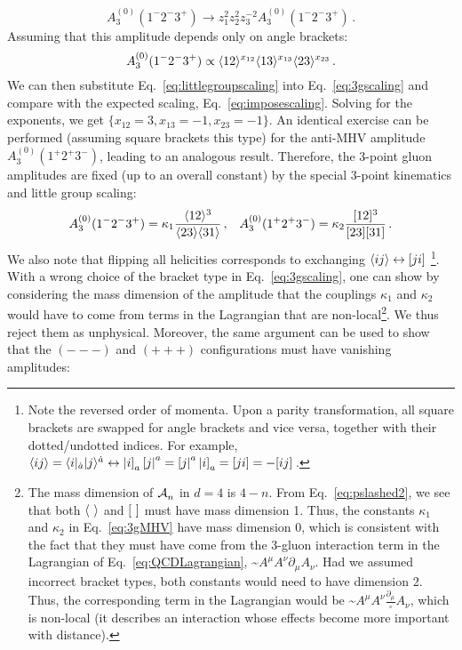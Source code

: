 \documentclass[main.tex]{subfiles}
\begin{document}
\begin{equation} \label{eq:imposescaling}
    A_3^{(0)} (1^-2^-3^+) \rightarrow z_1^2 z_2^2 z_3^{-2} A_3^{(0)}(1^-2^-3^+) \,.
\end{equation}
Assuming that this amplitude depends only on angle brackets:
\begin{equation} \label{eq:3gscaling}
    A_3^{(0)} (1^-2^-3^+) \propto \langle 12 \rangle^{x_{12}} \langle 13 \rangle^{x_{13}} \langle 23 \rangle^{x_{23}} \,.
\end{equation}
We can then substitute Eq.~\ref{eq:littlegroupscaling} into Eq.~\ref{eq:3gscaling} and compare with the expected scaling, Eq.~\ref{eq:imposescaling}. Solving for the exponents, we get $\{x_{12} = 3, x_{13} = -1, x_{23} = -1\}$. An identical exercise can be performed (assuming square brackets this type) for the anti-MHV amplitude $A_3^{(0)} (1^+2^+3^-)$, leading to an analogous result. Therefore, the 3-point gluon amplitudes are fixed (up to an overall constant) by the special 3-point kinematics and little group scaling:
\begin{align} \label{eq:3gMHV}
    A_3^{(0)} (1^-2^-3^+) = \kappa_1 \frac{\langle 12 \rangle^3}{\langle 23 \rangle\langle 31 \rangle}\,, && A_3^{(0)} (1^+2^+3^-) = \kappa_2 \frac{[ 12 ]^3}{[ 23 ][ 31 ]} \,.
\end{align}
We also note that flipping all helicities corresponds to exchanging $\langle ij \rangle \leftrightarrow [ ji ]$ \footnote{Note the reversed order of momenta. Upon a parity transformation, all square brackets are swapped for angle brackets and vice versa, together with their dotted/undotted indices. For example, $\langle ij \rangle = \langle i|_{\dot{a}} |j \rangle^{\dot{a}} \leftrightarrow \left| i \right]_a \left[ j \right|^a = \left[ j \right|^a \left| i \right]_a = [ ji ] = - [ ij ]\,$.}. With a wrong choice of the bracket type in Eq.~\ref{eq:3gscaling}, one can show by considering the mass dimension of the amplitude that the couplings $\kappa_1$ and $\kappa_2$ would have to come from terms in the Lagrangian that are non-local\footnote{The mass dimension of $\mathcal{A}_{n}^{}$ in $d=4$ is $4-n$. From Eq.~\ref{eq:pslashed2}, we see that both $\langle \phantom{i} \rangle$ and $\braketsq$ must have mass dimension 1. Thus, the constants $\kappa_1$ and $\kappa_2$ in Eq.~\ref{eq:3gMHV} have mass dimension 0, which is consistent with the fact that they must have come from the 3-gluon interaction term in the Lagrangian of Eq.~\ref{eq:QCDLagrangian}, \textasciitilde$A^\mu A^\nu \partial_\mu A_\nu$. Had we assumed incorrect bracket types, both constants would need to have dimension 2. Thus, the corresponding term in the Lagrangian would be \textasciitilde$A^\mu A^\nu \frac{\partial_\mu}{\square} A_\nu$, which is non-local (it describes an interaction whose effects become more important with distance).}. We thus reject them as unphysical. Moreover, the same argument can be used to show that the $(---)$ and $(+++)$ configurations must have vanishing amplitudes:
\end{document}
